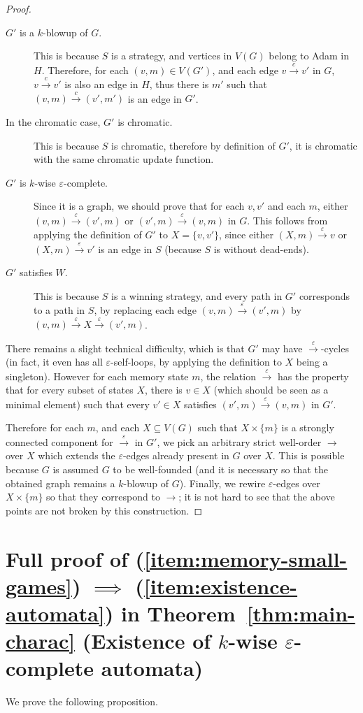 \documentclass[a4paper,UKenglish,cleveref, thm-restate]{lipics-v2021}
\newcommand{\re}[1]{\xrightarrow{#1}}
\newcommand{\eps}{\varepsilon}
\begin{document}
\begin{proof}
    \begin{description}
        \item[$G'$ is a $k$-blowup of $G$.]
        This is because $S$ is a strategy, and vertices in $V(G)$ belong to Adam in $H$.
        Therefore, for each $(v,m) \in V(G')$, and each edge $v \re c v'$ in $G$, $v \re c v'$ is also an edge in $H$, thus there is $m'$ such that $(v,m) \re c (v',m')$ is an edge in $G'$.
        \item[In the chromatic case, $G'$ is chromatic.]
        This is because $S$ is chromatic, therefore by definition of $G'$, it is chromatic with the same chromatic update function.
        \item[$G'$ is $k$-wise $\eps$-complete.] Since it is a graph, we should prove that for each $v,v'$ and each $m$, either $(v,m) \re \eps (v',m)$ or $(v',m) \re \eps (v,m)$ in $G$.
        This follows from applying the definition of $G'$ to $X=\{v,v'\}$, since either $(X,m) \re \eps v$ or $(X,m) \re \eps v'$ is an edge in $S$ (because $S$ is without dead-ends).
        \item[$G'$ satisfies $W$.] This is because $S$ is a winning strategy, and every path in $G'$ corresponds to a path in $S$, by replacing each edge $(v,m)\re \eps(v',m)$ by $(v,m) \re \eps X \re \eps (v',m)$.
    \end{description}

    There remains a slight technical difficulty, which is that $G'$ may have $\re \eps$-cycles (in fact, it even has all $\eps$-self-loops, by applying the definition to $X$ being a singleton).
    However for each memory state $m$, the relation $\re \eps$ has the property that for every subset of states $X$, there is $v \in X$ (which should be seen as a minimal element) such that every $v' \in X$ satisfies $(v',m) \re \eps (v,m)$ in $G'$.

    Therefore for each $m$, and each $X\subseteq V(G)$ such that $X \times \{m\}$ is a strongly connected component for $\re \eps$ in $G'$, we pick an arbitrary strict well-order $\re{}$ over $X$ which extends the $\eps$-edges already present in $G$ over $X$.
    This is possible because $G$ is assumed $G$ to be well-founded (and it is necessary so that the obtained graph remains a $k$-blowup of $G$).
    Finally, we rewire $\eps$-edges over $X \times \{m\}$ so that they correspond to $\re{}$; it is not hard to see that the above points are not broken by this construction.
\end{proof} 

\section{Full proof of (\ref{item:memory-small-games}) $\implies$ (\ref{item:existence-automata}) in Theorem~\ref{thm:main-charac} (Existence of $k$-wise $\eps$-complete automata)}\label{app:existence-eps-automata}
We prove the following proposition.
\end{document}

